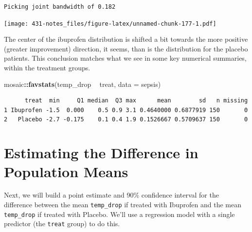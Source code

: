 \documentclass[
]{book}
\newenvironment{Shaded}{\begin{snugshade}}{\end{snugshade}}
\newcommand{\DataTypeTok}[1]{\textcolor[rgb]{0.13,0.29,0.53}{#1}}
\newcommand{\DecValTok}[1]{\textcolor[rgb]{0.00,0.00,0.81}{#1}}
\newcommand{\FloatTok}[1]{\textcolor[rgb]{0.00,0.00,0.81}{#1}}
\newcommand{\KeywordTok}[1]{\textcolor[rgb]{0.13,0.29,0.53}{\textbf{#1}}}
\newcommand{\NormalTok}[1]{#1}
\newcommand{\OperatorTok}[1]{\textcolor[rgb]{0.81,0.36,0.00}{\textbf{#1}}}
\newcommand{\OtherTok}[1]{\textcolor[rgb]{0.56,0.35,0.01}{#1}}
\newcommand{\StringTok}[1]{\textcolor[rgb]{0.31,0.60,0.02}{#1}}
\begin{document}
\begin{verbatim}
Picking joint bandwidth of 0.182
\end{verbatim}

\texttt{[image: 431-notes\_files/figure-latex/unnamed-chunk-177-1.pdf]}

The center of the ibuprofen distribution is shifted a bit towards the more positive (greater improvement) direction, it seems, than is the distribution for the placebo patients. This conclusion matches what we see in some key numerical summaries, within the treatment groups.

\begin{Shaded}
\begin{Highlighting}[]
\NormalTok{mosaic}\OperatorTok{::}\KeywordTok{favstats}\NormalTok{(temp_drop }\OperatorTok{~}\StringTok{ }\NormalTok{treat, }\DataTypeTok{data =}\NormalTok{ sepsis)}
\end{Highlighting}
\end{Shaded}

\begin{verbatim}
      treat  min     Q1 median  Q3 max      mean        sd   n missing
1 Ibuprofen -1.5  0.000    0.5 0.9 3.1 0.4640000 0.6877919 150       0
2   Placebo -2.7 -0.175    0.1 0.4 1.9 0.1526667 0.5709637 150       0
\end{verbatim}

\hypertarget{estimating-the-difference-in-population-means}{%
\section{Estimating the Difference in Population Means}\label{estimating-the-difference-in-population-means}}

Next, we will build a point estimate and 90\% confidence interval for the difference between the mean \texttt{temp\_drop} if treated with Ibuprofen and the mean \texttt{temp\_drop} if treated with Placebo. We'll use a regression model with a single predictor (the \texttt{treat} group) to do this.

\begin{Shaded}
\end{Shaded}
\end{document}
